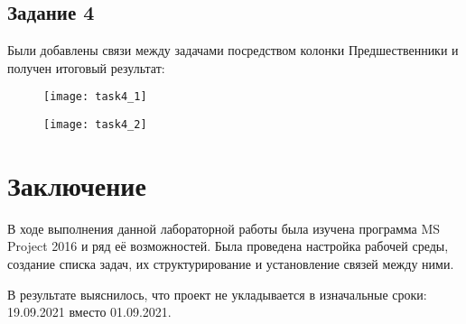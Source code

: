 \subsection*{Задание 4}

Были добавлены связи между задачами посредством колонки Предшественники и получен итоговый результат:

\begin{figure}[h!]
	\texttt{[image: task4\_1]}
\end{figure}

\begin{figure}[h!]
	\texttt{[image: task4\_2]}
\end{figure}

\clearpage

\section*{Заключение}

В ходе выполнения данной лабораторной работы была изучена программа MS Project 2016 и ряд её возможностей. Была проведена настройка рабочей среды, создание списка задач, их структурирование и установление связей между ними.

В результате выяснилось, что проект не укладывается в изначальные сроки: 19.09.2021 вместо 01.09.2021.
